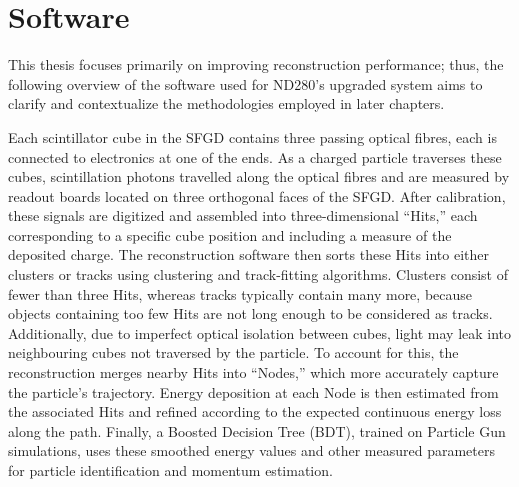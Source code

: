 \section{Software}
\label{sec:t2k-sw}
This thesis focuses primarily on improving reconstruction performance; thus, the following overview of the software used for ND280’s upgraded system aims to clarify and contextualize the methodologies employed in later chapters.

Each scintillator cube in the SFGD contains three passing optical fibres, each is connected to electronics at one of the ends. 
As a charged particle traverses these cubes, scintillation photons travelled along the optical fibres and are measured by readout boards located on three orthogonal faces of the SFGD.  
After calibration, these signals are digitized and assembled into three-dimensional “Hits,” each corresponding to a specific cube position and including a measure of the deposited charge.  
The reconstruction software then sorts these Hits into either clusters or tracks using clustering and track-fitting algorithms.  
Clusters consist of fewer than three Hits, whereas tracks typically contain many more, because objects containing too few Hits are not long enough to be considered as tracks. 
Additionally, due to imperfect optical isolation between cubes, light may leak into neighbouring cubes not traversed by the particle.  
To account for this, the reconstruction merges nearby Hits into “Nodes,” which more accurately capture the particle’s trajectory.  
Energy deposition at each Node is then estimated from the associated Hits and refined according to the expected continuous energy loss along the path.  
Finally, a Boosted Decision Tree (BDT), trained on Particle Gun simulations, uses these smoothed energy values and other measured parameters for particle identification and momentum estimation.  